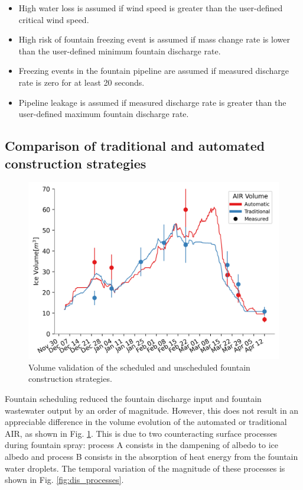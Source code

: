 \begin{itemize}

	\item High water loss is assumed if wind speed is greater than the user-defined critical wind speed.

	\item High risk of fountain freezing event is assumed if mass change rate is lower than the user-defined minimum fountain discharge rate.

	\item Freezing events in the fountain pipeline are assumed if measured discharge rate is zero for at least 20
	      seconds.

	\item Pipeline leakage is assumed if measured discharge rate is greater than the user-defined maximum fountain discharge rate.

\end{itemize}

\subsection{Comparison of traditional and automated construction strategies}

\begin{figure}[htb] \includegraphics[width=\textwidth] {figs/CH_validation.png} \caption{Volume validation of the
		scheduled and unscheduled fountain construction strategies.} \label{fig:validation} \end{figure}

Fountain scheduling reduced the fountain discharge input and fountain wastewater output by an order of
magnitude. However, this does not result in an appreciable difference in the volume evolution of the automated
or traditional AIR, as shown in Fig. \ref{fig:validation}. This is due to two counteracting surface processes
during fountain spray: process A consists in the dampening of albedo to ice albedo and process B consists in the
absorption of heat energy from the fountain water droplets. The temporal variation of the magnitude of these
processes is shown in Fig. \ref{fig:dis_processes}.

